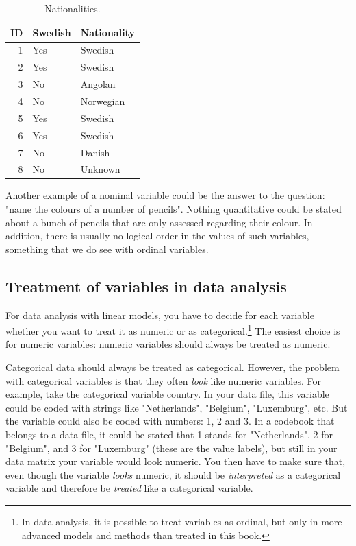 \documentclass[]{book}\usepackage[]{graphicx}\usepackage[]{color}
\begin{document}
\begin{table}[ht]
\centering
\caption{Nationalities.} 
\label{tab:data_9}
\begin{tabular}{rll}
  \hline
ID & Swedish & Nationality \\ 
  \hline
1 & Yes & Swedish \\ 
  2 & Yes & Swedish \\ 
  3 & No & Angolan \\ 
  4 & No & Norwegian \\ 
  5 & Yes & Swedish \\ 
  6 & Yes & Swedish \\ 
  7 & No & Danish \\ 
  8 & No & Unknown \\ 
   \hline
\end{tabular}
\end{table}


Another example of a nominal variable could be the answer to the question: "name the colours of a number of pencils". Nothing quantitative could be stated about a bunch of pencils that are only assessed regarding their colour. In addition, there is usually no logical order in the values of such variables, something that we do see with ordinal variables.



\subsection{Treatment of variables in data analysis}
For data analysis with linear models, you have to decide for each variable whether you want to treat it as numeric or as categorical.\footnote{In data analysis, it is possible to treat variables as ordinal, but only in more advanced models and methods than treated in this book.} The easiest choice is for numeric variables: numeric variables should always be treated as numeric.

Categorical data should always be treated as categorical. However, the problem with categorical variables is that they often \textit{look} like numeric variables. For example, take the categorical variable country. In your data file, this variable could be coded with strings like "Netherlands", "Belgium", "Luxemburg", etc. But the variable could also be coded with numbers: 1, 2 and 3. In a codebook that belongs to a data file, it could be stated that 1 stands for "Netherlands", 2 for "Belgium", and 3 for "Luxemburg" (these are the value labels), but still in your data matrix your variable would look numeric. You then have to make sure that, even though the variable \textit{looks} numeric, it should be \textit{interpreted} as a categorical variable and therefore be \textit{treated} like a categorical variable.
\end{document}
